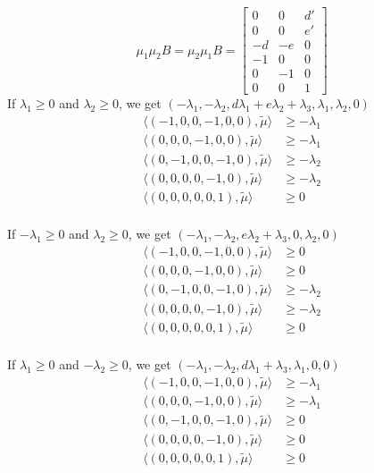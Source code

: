 \documentclass{amsart}
\numberwithin{theorem}{section}
\begin{document}
  \[
    \mu_1\mu_2 B=\mu_2\mu_1 B=\left[\begin{array}{ccc} 
    0 & 0 & d' \\ 
    0 & 0 & e'\\ 
    -d & -e & 0\\ 
    -1 & 0 & 0\\ 
    0 & -1 & 0\\ 
    0 & 0 & 1
    \end{array}\right]
  \]
  If $\lambda_1 \ge 0$ and $\lambda_2 \ge 0$, we get $(-\lambda_1,-\lambda_2,d\lambda_1+e\lambda_2+\lambda_3,\lambda_1,\lambda_2,0)$ 
  \begin{align*}
    \langle (-1,0,0,-1,0,0), \tilde\mu\rangle &\ge -\lambda_1\\ 
    \langle (0,0,0,-1,0,0), \tilde\mu\rangle &\ge -\lambda_1\\ 
    \langle (0,-1,0,0,-1,0), \tilde\mu\rangle &\ge -\lambda_2\\ 
    \langle (0,0,0,0,-1,0), \tilde\mu\rangle &\ge -\lambda_2\\ 
    \langle (0,0,0,0,0,1), \tilde\mu\rangle &\ge 0\\ 
  \end{align*}

  If $-\lambda_1 \ge 0$ and $\lambda_2 \ge 0$, we get $(-\lambda_1,-\lambda_2,e\lambda_2+\lambda_3,0,\lambda_2,0)$
  \begin{align*}
    \langle (-1,0,0,-1,0,0), \tilde\mu\rangle &\ge 0\\ 
    \langle (0,0,0,-1,0,0), \tilde\mu\rangle &\ge 0\\ 
    \langle (0,-1,0,0,-1,0), \tilde\mu\rangle &\ge -\lambda_2\\ 
    \langle (0,0,0,0,-1,0), \tilde\mu\rangle &\ge -\lambda_2\\ 
    \langle (0,0,0,0,0,1), \tilde\mu\rangle &\ge 0\\ 
  \end{align*}

  If $\lambda_1 \ge 0$ and $-\lambda_2 \ge 0$, we get $(-\lambda_1,-\lambda_2,d\lambda_1+\lambda_3,\lambda_1,0,0)$
  \begin{align*}
    \langle (-1,0,0,-1,0,0), \tilde\mu\rangle &\ge -\lambda_1\\ 
    \langle (0,0,0,-1,0,0), \tilde\mu\rangle &\ge -\lambda_1\\ 
    \langle (0,-1,0,0,-1,0), \tilde\mu\rangle &\ge 0\\ 
    \langle (0,0,0,0,-1,0), \tilde\mu\rangle &\ge 0\\ 
    \langle (0,0,0,0,0,1), \tilde\mu\rangle &\ge 0\\ 
  \end{align*}
\end{document}
